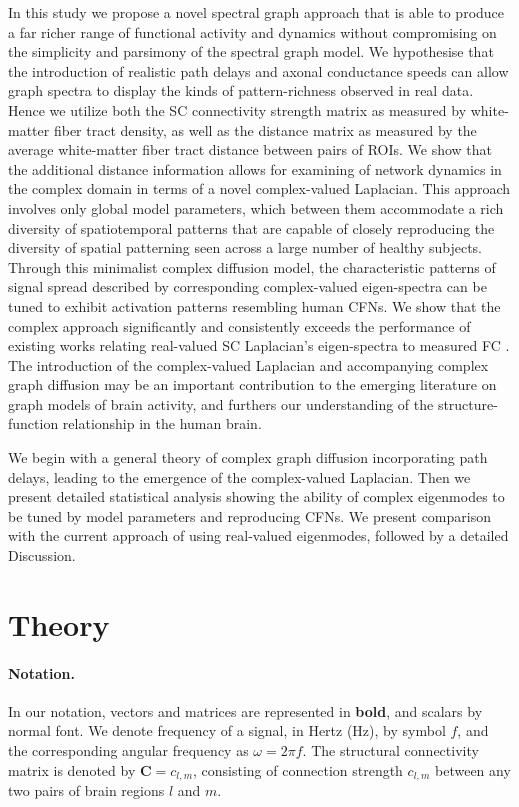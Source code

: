 In this study we propose a novel spectral graph approach that is able to produce a far richer range of functional activity and dynamics without compromising on the simplicity and parsimony of the spectral graph model. We hypothesise that the introduction of realistic path delays and axonal conductance speeds can allow graph spectra to display the kinds of pattern-richness observed in real data. Hence we utilize both the SC connectivity strength matrix as measured by white-matter fiber tract density, as well as the distance matrix as measured by the average white-matter fiber tract distance between pairs of ROIs. We show that the additional distance information allows for examining of network dynamics in the complex domain in terms of a novel complex-valued Laplacian. This approach involves only global model parameters, which between them accommodate a rich diversity of spatiotemporal patterns that are capable of closely reproducing the diversity of spatial patterning seen across a large number of healthy subjects. Through this minimalist complex diffusion model, the characteristic patterns of signal spread described by corresponding complex-valued eigen-spectra can be tuned to exhibit activation patterns resembling human CFNs. We show that the complex approach significantly and consistently exceeds the performance of existing works relating real-valued SC Laplacian's eigen-spectra to measured FC \cite{Atasoy2016, preti_decoupling_2019, Abdelnour2018, honey_predicting_2009}. The introduction of the complex-valued Laplacian and accompanying complex graph diffusion may be an important contribution to the emerging literature on graph models of brain activity, and furthers our understanding of the structure-function relationship in the human brain.

We begin with a general theory of complex graph diffusion incorporating path delays, leading to the emergence of the complex-valued Laplacian. Then we present detailed statistical analysis showing the ability of complex eigenmodes to be tuned by model parameters and reproducing CFNs. We present comparison with the current approach of using real-valued eigenmodes, followed by a detailed Discussion.

\section{Theory}
\label{sec:theory}

\paragraph{Notation.} In our notation, vectors and matrices are represented in \textbf{bold}, and scalars by normal font. We denote frequency of a signal, in Hertz (Hz), by symbol $f$, and the corresponding angular frequency as $\omega = 2 \pi f$. The structural connectivity matrix is denoted by $\bm{C} = c_{l,m}$, consisting of connection strength $c_{l,m}$ between any two pairs of brain regions $l$ and $m$.


